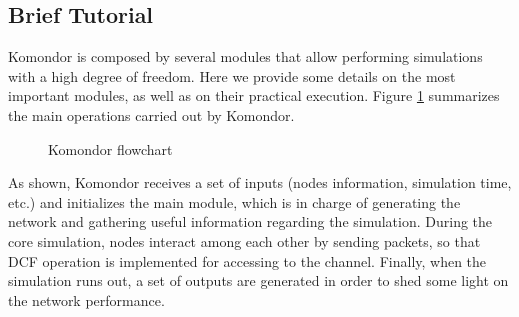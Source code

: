 \documentclass[a4paper]{article}
\begin{document}
	\subsection{Brief Tutorial}
	\label{section:brief_tutorial}
		Komondor is composed by several modules that allow performing simulations with a high degree of freedom. Here we provide some details on the most important modules, as well as on their practical execution. Figure \ref{fig:komondor_flowchart} summarizes the main operations carried out by Komondor.
		\begin{figure}[h!]
			\centering
			\caption{Komondor flowchart}
			\label{fig:komondor_flowchart}
		\end{figure}		
		
		As shown, Komondor receives a set of inputs (nodes information, simulation time, etc.) and initializes the main module, which is in charge of generating the network and gathering useful information regarding the simulation. During the core simulation, nodes interact among each other by sending packets, so that DCF operation is implemented for accessing to the channel. Finally, when the simulation runs out, a set of outputs are generated in order to shed some light on the network performance.
		
\end{document}
